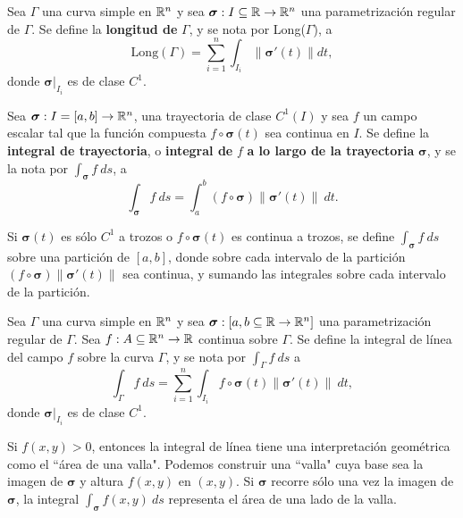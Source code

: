 \begin{definition}
    Sea $\Gamma$ una curva simple en $\mathbb{R}^n$ y sea $\boldsymbol{\sigma}:I\subseteq\mathbb{R}\to\mathbb{R}^n$ una parametrizaci\'on regular de $\Gamma$. Se define la \textbf{longitud de} $\Gamma$, y se nota por Long($\Gamma$), a 
    \[
        \text{Long}(\Gamma)=\sum_{i=1}^{n}\int_{I_i}\|\boldsymbol{\sigma}'(t)\|dt,    
    \]
    donde $\boldsymbol{\sigma}\lvert_{I_i}$ es de clase $C^1$.
\end{definition}

\begin{definition}
    Sea $\boldsymbol{\sigma}:I=[a,b]\to\mathbb{R}^n$, una trayectoria de clase $C^1(I)$ y sea $f$ un campo escalar tal que la funci\'on compuesta $f\circ\boldsymbol{\sigma}(t)$ sea continua en $I$. Se define la \textbf{integral de trayectoria}, o \textbf{integral de} $f$ \textbf{a lo largo de la trayectoria} $\boldsymbol{\sigma}$, y se la nota por $\int_{\boldsymbol{\sigma}}f\:ds$, a
    \[
        \int_{\boldsymbol{\sigma}}f\:ds=\int_a^b (f\circ\boldsymbol{\sigma})\|\boldsymbol{\sigma}'(t)\|\:dt.
    \]
\end{definition}

Si $\boldsymbol{\sigma}(t)$ es s\'olo $C^1$ a trozos o $f\circ\boldsymbol{\sigma}(t)$ es continua a trozos, se define $\int_{\boldsymbol{\sigma}}f\:ds$ sobre una partici\'on de $[a,b]$, donde sobre cada intervalo de la partici\'on $(f\circ\boldsymbol{\sigma})\|\boldsymbol{\sigma}'(t)\|$ sea continua, y sumando las integrales sobre cada intervalo de la partici\'on. 

\begin{definition}
    Sea $\Gamma$ una curva simple en $\mathbb{R}^n$ y sea $\boldsymbol{\sigma}:[a,b\subseteq\mathbb{R}\to\mathbb{R}^n]$ una parametrizaci\'on regular de $\Gamma$. Sea $f:A\subseteq\mathbb{R}^n\to\mathbb{R}$ continua sobre $\Gamma$. Se define la integral de l\'inea del campo $f$ sobre la curva $\Gamma$, y se nota por $\int_{\Gamma}f\:ds$ a
    \[
        \int_{\Gamma}f\:ds=\sum_{i=1}^{n}\int_{I_i}f\circ\boldsymbol{\sigma}(t)\|\boldsymbol{\sigma}'(t)\|\:dt,  
    \]
    donde $\boldsymbol{\sigma}\lvert_{I_i}$ es de clase $C^1$.
\end{definition}

\begin{obs} 
Si $f(x,y)>0$, entonces la integral de l\'inea tiene una interpretaci\'on geom\'etrica como el ``\'area de una valla". Podemos construir una ``valla" cuya base sea la imagen de $\boldsymbol{\sigma}$ y altura $f(x,y)$ en $(x,y)$. Si $\boldsymbol{\sigma}$ recorre s\'olo una vez la imagen de $\boldsymbol{\sigma}$, la integral $\int_{\boldsymbol{\sigma}}f(x,y)\:ds$ representa el \'area de una lado de la valla.
\end{obs}

